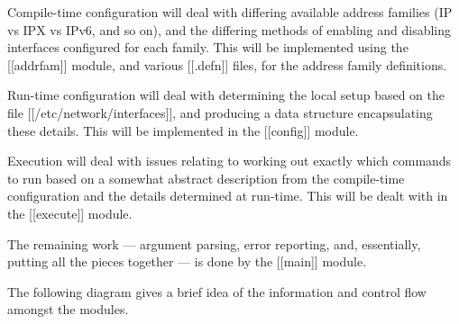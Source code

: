 \documentclass{article}
\begin{document}
Compile-time configuration will deal with differing available address
families (IP vs IPX vs IPv6, and so on), and the differing methods of
enabling and disabling interfaces configured for each family. This will
be implemented using the [[addrfam]] module, and various [[.defn]] files,
for the address family definitions.

Run-time configuration will deal with determining the local setup
based on the file [[/etc/network/interfaces]], and producing a data
structure encapsulating these details. This will be implemented in the
[[config]] module.

Execution will deal with issues relating to working out exactly which
commands to run based on a somewhat abstract description from the
compile-time configuration and the details determined at
run-time. This will be dealt with in the [[execute]] module.

The remaining work --- argument parsing, error reporting, and,
essentially, putting all the pieces together --- is done by the
[[main]] module.

The following diagram gives a brief idea of the information and control
flow amongst the modules.

\def\vsep{2.5cm}
\def\hsep{1.4cm}
\begin{figure}
\centering
{}
\end{figure}
\end{document}
